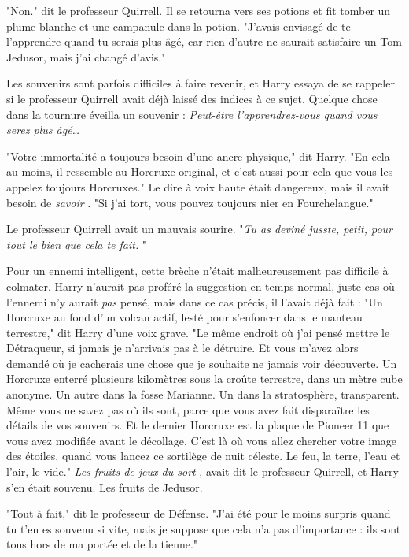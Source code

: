 "Non." dit le professeur Quirrell. Il se retourna vers ses potions et fit tomber un plume blanche et une campanule dans la potion. "J'avais envisagé de te l'apprendre quand tu serais plus âgé, car rien d'autre ne saurait satisfaire un Tom Jedusor, mais j'ai changé d'avis."

Les souvenirs sont parfois difficiles à faire revenir, et Harry essaya de se rappeler si le professeur Quirrell avait déjà laissé des indices à ce sujet. Quelque chose dans la tournure éveilla un souvenir : \emph{Peut-être l'apprendrez-vous quand vous serez plus âgé…} 

"Votre immortalité a toujours besoin d'une ancre physique," dit Harry. "En cela au moins, il ressemble au Horcruxe original, et c'est aussi pour cela que vous les appelez toujours Horcruxes." Le dire à voix haute était dangereux, mais il avait besoin de \emph{savoir} . "Si j'ai tort, vous pouvez toujours nier en Fourchelangue."

Le professeur Quirrell avait un mauvais sourire. "\emph{Tu as deviné jusste, petit, pour tout le bien que cela te fait.} "

Pour un ennemi intelligent, cette brèche n'était malheureusement pas difficile à colmater. Harry n'aurait pas proféré la suggestion en temps normal, juste cas où l'ennemi n'y aurait \emph{pas}  pensé, mais dans ce cas précis, il l'avait déjà fait : "Un Horcruxe au fond d'un volcan actif, lesté pour s'enfoncer dans le manteau terrestre," dit Harry d'une voix grave. "Le même endroit où j'ai pensé mettre le Détraqueur, si jamais je n'arrivais pas à le détruire. Et vous m'avez alors demandé où je cacherais une chose que je souhaite ne jamais voir découverte. Un Horcruxe enterré plusieurs kilomètres sous la croûte terrestre, dans un mètre cube anonyme. Un autre dans la fosse Marianne. Un dans la stratosphère, transparent. Même vous ne savez pas où ils sont, parce que vous avez fait disparaître les détails de vos souvenirs. Et le dernier Horcruxe est la plaque de Pioneer 11 que vous avez modifiée avant le décollage. C'est là où vous allez chercher votre image des étoiles, quand vous lancez ce sortilège de nuit céleste. Le feu, la terre, l'eau et l'air, le vide." \emph{Les fruits de jeux du sort} , avait dit le professeur Quirrell, et Harry s'en était souvenu. Les fruits de Jedusor.

"Tout à fait," dit le professeur de Défense. "J'ai été pour le moins surpris quand tu t'en es souvenu si vite, mais je suppose que cela n'a pas d'importance : ils sont tous hors de ma portée et de la tienne."


